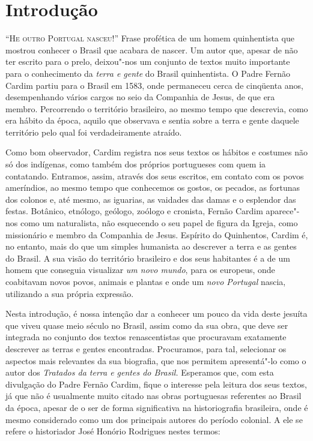 \chapter[Introdução, \emph{por Ana Maria de Azevedo}]{Introdução}


\textsc{``He outro Portugal nasceu!''} Frase profética de um homem quinhentista que mostrou conhecer o
Brasil que acabara de nascer. Um autor que, apesar de não ter escrito
para o prelo, deixou"-nos um conjunto de textos muito importante para o
conhecimento da \textit{terra e gente} do Brasil quinhentista. O Padre
Fernão Cardim partiu para o Brasil em 1583, onde permaneceu cerca de
cinqüenta anos, desempenhando vários cargos no seio da Companhia de
Jesus, de que era membro. Percorrendo o território brasileiro, ao mesmo
tempo que descrevia, como era hábito da época, aquilo que observava e
sentia sobre a terra e gente daquele território pelo qual foi
verdadeiramente atraído. 

Como bom observador, Cardim registra nos seus textos os hábitos e
costumes não só dos indígenas, como também dos próprios portugueses
com quem ia contatando. Entramos, assim, através dos seus escritos, em
contato com os povos ameríndios, ao mesmo tempo que conhecemos os
gostos, os pecados, as fortunas dos colonos e, até mesmo, as iguarias,
as vaidades das damas e o esplendor das festas. Botânico, etnólogo,
geólogo, zoólogo e cronista, Fernão Cardim aparece"-nos como um
naturalista, não esquecendo o seu papel de figura da Igreja, como
missionário e membro da Companhia de Jesus. Espírito do Quinhentos,
Cardim é, no entanto, mais do que um simples humanista ao descrever a
terra e as gentes do Brasil. A sua visão do território brasileiro e dos
seus habitantes é a de um homem que conseguia visualizar \textit{um
novo mundo}, para os europeus, onde coabitavam novos povos,
animais e plantas e onde um \textit{novo Portugal} nascia, utilizando a
sua própria expressão.

Nesta introdução, é nossa intenção dar a conhecer um pouco da vida
deste jesuíta que viveu quase meio século no Brasil, assim como da sua
obra, que deve ser integrada no conjunto dos textos renascentistas que
procuravam exatamente descrever as terras e gentes encontradas.
Procuramos, para tal, selecionar os aspectos mais relevantes da sua
biografia, que nos permitem apresentá"-lo como o autor dos
\textit{Tratados da terra e gentes do Brasil.} Esperamos que, com esta
divulgação do Padre Fernão Cardim, fique o interesse pela leitura dos
seus textos, já que não é usualmente muito citado nas obras portuguesas
referentes ao Brasil da época, apesar de o ser de forma significativa
na historiografia brasileira, onde é mesmo considerado como um dos
principais autores do período colonial. A ele se refere o historiador
José Honório Rodrigues nestes termos:

